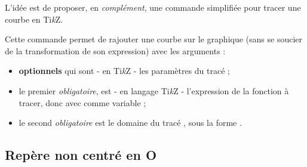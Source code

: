 \documentclass[a4paper,french,11pt]{article}
\providecommand\tikzlogo{Ti\textit{k}Z}
\let\TikZ\tikzlogo
\newcommand\ctex[1]{\tcbox[vignettelatex]{#1}}
\newcommand\Cle[1]{{\bfseries\sffamily\textlangle #1\textrangle}}
\begin{document}
\begin{codeidee}
L'idée est de proposer, en \textit{complément}, une commande simplifiée pour tracer une courbe en \TikZ.
\end{codeidee}

\begin{codetex}
\end{codetex}

\begin{codecles}
Cette commande permet de rajouter une courbe sur le graphique (sans se soucier de la transformation de son expression) avec les arguments :

\begin{itemize}
	\item \Cle{optionnels} qui sont - en \TikZ{} - les paramètres du tracé ;
	\item le premier \textit{obligatoire}, est - en langage \TikZ{} - l'expression de la fonction à tracer, donc avec \ctex{\textbackslash{}x} comme variable ;
	\item le second \textit{obligatoire} est le domaine du tracé , sous la forme \ctex{valxmin:valxmax}.
\end{itemize}
\end{codecles}

\begin{codetex}
\end{codetex}

\begin{codesortie}
\end{codesortie}

\subsection{Repère non centré en O}
\end{document}
